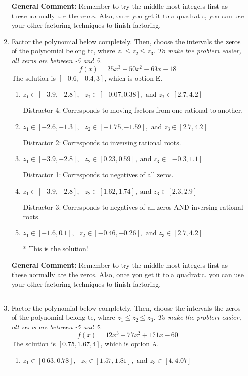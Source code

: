 \documentclass{extbook}[14pt]
\newcommand{\litem}[1]{\item #1

\rule{\textwidth}{0.4pt}}
\begin{document}
\begin{enumerate}
{\textbf{General Comment:} Remember to try the middle-most integers first as these normally are the zeros. Also, once you get it to a quadratic, you can use your other factoring techniques to finish factoring.
}
\litem{
Factor the polynomial below completely. Then, choose the intervals the zeros of the polynomial belong to, where $z_1 \leq z_2 \leq z_3$. \textit{To make the problem easier, all zeros are between -5 and 5.}
\[ f(x) = 25x^{3} -50 x^{2} -69 x -18 \]The solution is \( [-0.6, -0.4, 3] \), which is option E.\begin{enumerate}[label=\Alph*.]
\item \( z_1 \in [-3.9, -2.8], \text{   }  z_2 \in [-0.07, 0.38], \text{   and   } z_3 \in [2.7, 4.2] \)

 Distractor 4: Corresponds to moving factors from one rational to another.
\item \( z_1 \in [-2.6, -1.3], \text{   }  z_2 \in [-1.75, -1.59], \text{   and   } z_3 \in [2.7, 4.2] \)

 Distractor 2: Corresponds to inversing rational roots.
\item \( z_1 \in [-3.9, -2.8], \text{   }  z_2 \in [0.23, 0.59], \text{   and   } z_3 \in [-0.3, 1.1] \)

 Distractor 1: Corresponds to negatives of all zeros.
\item \( z_1 \in [-3.9, -2.8], \text{   }  z_2 \in [1.62, 1.74], \text{   and   } z_3 \in [2.3, 2.9] \)

 Distractor 3: Corresponds to negatives of all zeros AND inversing rational roots.
\item \( z_1 \in [-1.6, 0.1], \text{   }  z_2 \in [-0.46, -0.26], \text{   and   } z_3 \in [2.7, 4.2] \)

* This is the solution!
\end{enumerate}

\textbf{General Comment:} Remember to try the middle-most integers first as these normally are the zeros. Also, once you get it to a quadratic, you can use your other factoring techniques to finish factoring.
}
\litem{
Factor the polynomial below completely. Then, choose the intervals the zeros of the polynomial belong to, where $z_1 \leq z_2 \leq z_3$. \textit{To make the problem easier, all zeros are between -5 and 5.}
\[ f(x) = 12x^{3} -77 x^{2} +131 x -60 \]The solution is \( [0.75, 1.67, 4] \), which is option A.\begin{enumerate}[label=\Alph*.]
\item \( z_1 \in [0.63, 0.78], \text{   }  z_2 \in [1.57, 1.81], \text{   and   } z_3 \in [4, 4.07] \)


\end{enumerate}}
\end{enumerate}
\end{document}
